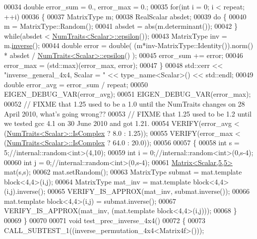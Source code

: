 \begin{DoxyCode}
00034   \textcolor{keywordtype}{double} error\_sum = 0., error\_max = 0.;
00035   \textcolor{keywordflow}{for}(\textcolor{keywordtype}{int} i = 0; i < repeat; ++i)
00036   \{
00037     MatrixType m;
00038     RealScalar absdet;
00039     \textcolor{keywordflow}{do} \{
00040       m = MatrixType::Random();
00041       absdet = abs(m.determinant());
00042     \} \textcolor{keywordflow}{while}(absdet < \hyperlink{group___core___module_struct_eigen_1_1_num_traits}{NumTraits<Scalar>::epsilon}());
00043     MatrixType inv = m.\hyperlink{group___core___module_adb9af427f317202366c2832876064eb3}{inverse}();
00044     \textcolor{keywordtype}{double} error = double( (m*inv-MatrixType::Identity()).norm() * absdet / 
      \hyperlink{group___core___module_struct_eigen_1_1_num_traits}{NumTraits<Scalar>::epsilon}() );
00045     error\_sum += error;
00046     error\_max = (std::max)(error\_max, error);
00047   \}
00048   std::cerr << \textcolor{stringliteral}{"inverse\_general\_4x4, Scalar = "} << type\_name<Scalar>() << std::endl;
00049   \textcolor{keywordtype}{double} error\_avg = error\_sum / repeat;
00050   EIGEN\_DEBUG\_VAR(error\_avg);
00051   EIGEN\_DEBUG\_VAR(error\_max);
00052    \textcolor{comment}{// FIXME that 1.25 used to be a 1.0 until the NumTraits changes on 28 April 2010, what's going wrong??}
00053    \textcolor{comment}{// FIXME that 1.25 used to be 1.2 until we tested gcc 4.1 on 30 June 2010 and got 1.21.}
00054   VERIFY(error\_avg < (\hyperlink{group___core___module_struct_eigen_1_1_num_traits}{NumTraits<Scalar>::IsComplex} ? 8.0 : 1.25));
00055   VERIFY(error\_max < (\hyperlink{group___core___module_struct_eigen_1_1_num_traits}{NumTraits<Scalar>::IsComplex} ? 64.0 : 20.0));
00056 
00057   \{
00058     \textcolor{keywordtype}{int} s = 5;\textcolor{comment}{//internal::random<int>(4,10);}
00059     \textcolor{keywordtype}{int} i = 0;\textcolor{comment}{//internal::random<int>(0,s-4);}
00060     \textcolor{keywordtype}{int} j = 0;\textcolor{comment}{//internal::random<int>(0,s-4);}
00061     \hyperlink{group___core___module_class_eigen_1_1_matrix}{Matrix<Scalar,5,5>} mat(s,s);
00062     mat.setRandom();
00063     MatrixType submat = mat.template block<4,4>(i,j);
00064     MatrixType mat\_inv = mat.template block<4,4>(i,j).inverse();
00065     VERIFY\_IS\_APPROX(mat\_inv, submat.inverse());
00066     mat.template block<4,4>(i,j) = submat.inverse();
00067     VERIFY\_IS\_APPROX(mat\_inv, (mat.template block<4,4>(i,j)));
00068   \}
00069 \}
00070 
00071 \textcolor{keywordtype}{void} test\_prec\_inverse\_4x4()
00072 \{
00073   CALL\_SUBTEST\_1((inverse\_permutation\_4x4<Matrix4f>()));

\end{DoxyCode}
